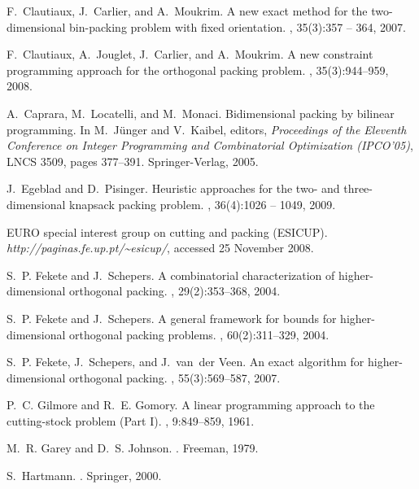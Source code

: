 \documentclass[a4paper,12pt]{article}
\begin{document}
\begin{thebibliography}{10}
F.~Clautiaux, J.~Carlier, and A.~Moukrim.
\newblock A new exact method for the two-dimensional bin-packing problem with
  fixed orientation.
, 35(3):357 -- 364, 2007.

F.~Clautiaux, A.~Jouglet, J.~Carlier, and A.~Moukrim.
\newblock A new constraint programming approach for the orthogonal packing
  problem.
, 35(3):944--959, 2008.

A.~Caprara, M.~Locatelli, and M.~Monaci.
\newblock Bidimensional packing by bilinear programming.
\newblock In M.~{J\"unger} and V.~Kaibel, editors, {\em Proceedings of the
  Eleventh Conference on Integer Programming and Combinatorial Optimization
  (IPCO'05)}, LNCS 3509, pages 377--391. Springer-Verlag, 2005.

J.~Egeblad and D.~Pisinger.
\newblock Heuristic approaches for the two- and three-dimensional knapsack
  packing problem.
, 36(4):1026 -- 1049, 2009.

{EURO} special interest group on cutting and packing ({ESICUP}).
\newblock \emph{http://paginas.fe.up.pt/\~{ }esicup/}, accessed 25 November
  2008.

S.~P. Fekete and J.~Schepers.
\newblock A combinatorial characterization of higher-dimensional orthogonal
  packing.
, 29(2):353--368, 2004.

S.~P. Fekete and J.~Schepers.
\newblock A general framework for bounds for higher-dimensional orthogonal
  packing problems.
, 60(2):311--329,
  2004.

S.~P. Fekete, J.~Schepers, and J.~van~der Veen.
\newblock An exact algorithm for higher-dimensional orthogonal packing.
, 55(3):569--587, 2007.

P.~C. Gilmore and R.~E. Gomory.
\newblock A linear programming approach to the cutting-stock problem ({P}art
  {I}).
, 9:849--859, 1961.

M.~R. Garey and D.~S. Johnson.
.
\newblock Freeman, 1979.

S.~Hartmann.
.
\newblock Springer, 2000.


\end{thebibliography}
\end{document}

